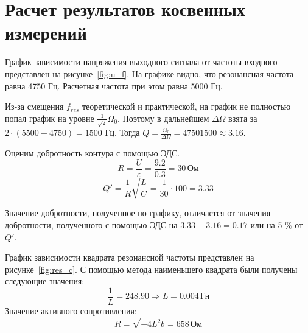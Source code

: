 \section{Расчет результатов косвенных измерений}
График зависимости напряжения выходного сигнала от частоты входного
представлен на рисунке~\ref{fig:u_f}.
На графике видно, что резонансная частота равна 4750 Гц.
Расчетная частота при этом равна 5000 Гц.

Из-за смещения $f_{res}$ теоретической и практической, на график не полностью
попал график на уровне $\frac{1}{\sqrt{2}} \Omega_0$.
Поэтому в дальнейшем $\Delta \Omega$ взята за $2 \cdot (5500 - 4750) = 1500$ Гц.
Тогда $Q = \frac{\Omega_0}{\Delta \Omega} = {4750}{1500} \approx 3.16$.

Оценим добротность контура с помощью ЭДС.
\[
	R = \frac{U}{\varepsilon} = \frac{9.2}{0.3} = 30 \, \text{Ом}
\]
\[
	Q' = \frac{1}{R} \sqrt{\frac{L}{C}} = \frac{1}{30} \cdot 100 = 3.33
\]

Значение добротности, полученное по графику, отличается от значения добротности,
полученного с помощью ЭДС на \(3.33 - 3.16 = 0.17\) или на 5 \% от \(Q'\).

График зависимости квадрата резонансной частоты представлен на рисунке~\ref{fig:res_c}.
С помощью метода наименьшего квадрата были получены следующие значения:
\[
	\frac{1}{L} = 248.90 \Rightarrow L = 0.004 \, \text{Гн}
\]
Значение активного сопротивления:
\[
	R = \sqrt{- 4 L^2 b} = 658 \, \text{Ом}
\]
